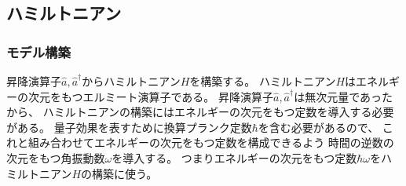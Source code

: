 
\subsection{ハミルトニアン}

\subsubsection{モデル構築}

昇降演算子$\hat{a},\hat{a}^\dagger$からハミルトニアン$H$を構築する。
ハミルトニアン$H$はエネルギーの次元をもつエルミート演算子である。
昇降演算子$\hat{a},\hat{a}^\dagger$は無次元量であったから、
ハミルトニアンの構築にはエネルギーの次元をもつ定数を導入する必要がある。
量子効果を表すために換算プランク定数$\hbar$を含む必要があるので、
これと組み合わせてエネルギーの次元をもつ定数を構成できるよう
時間の逆数の次元をもつ角振動数$\omega$を導入する。
つまりエネルギーの次元をもつ定数$\hbar\omega$をハミルトニアン$H$の構築に使う。


